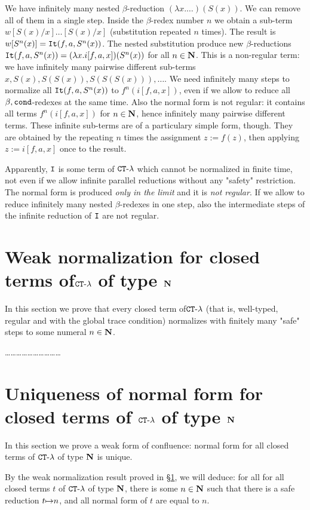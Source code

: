 \documentclass{article}
\begin{document}
We have infinitely many nested $\beta$-reduction $(\lambda x. \ldots)(S(x))$.
We can remove all of them in a single step. Inside the $\beta$-redex number $n$ we obtain a sub-term
$w[S(x)/x]\ldots[S(x)/x]$ (substitution repeated $n$ times).
The result is $w[S^n(x)] = {\tt It}(f,a,S^n(x))$.
The nested substitution produce new $\beta$-reductions 
${\tt It}(f,a,S^n(x)) = (\lambda x.i[f,a,x])(S^n(x))$ for all $n \in {\bf N}$.
This is a non-regular term: we have infinitely many pairwise different 
sub-terms $x,S(x),S(S(x)), S(S(S(x))), \ldots$.
We need infinitely many steps to normalize all ${\tt It}(f,a,S^n(x))$ to $f^n(i[f,a,x])$, 
even if we allow to reduce all $\beta,{\tt cond}$-redexes at the same time.
Also the normal form is not regular: it contains all terms $f^n(i[f,a,x])$ for $n \in {\bf N}$, hence
infinitely many pairwise different terms. These infinite sub-terms are of a particulary simple form, though. 
They are obtained by the repeating $n$ times the assignment $z:=f(z)$, then applying $z:=i[f,a,x]$ once
to the result.

Apparently, ${\tt I}$ 
is some term of ${ {\tt CT} \mbox{-} \lambda}$ which cannot be normalized in finite time, not even if we allow
infinite parallel reductions without any "safety" restriction. The normal form is produced \emph{only in the limit}
and it is \emph{not regular}. If we allow to reduce infinitely many nested $\beta$-redexes in one step, also
the intermediate steps of the infinite reduction of ${\tt I}$ are not regular.


\section{Weak normalization for closed terms of${ {\tt CT} \mbox{-} \lambda}$ of type ${\bf N}$}
\label{section-weak-normalization}
In this section we prove that every closed term of${ {\tt CT} \mbox{-} \lambda}$
 (that is, well-typed, regular and with the global trace condition) normalizes with finitely many "safe" steps
to some numeral $n \in {\bf N}$.

\ldots\ldots\ldots\ldots\ldots\ldots\ldots\ldots\ldots\ldots

\section{Uniqueness of normal form for closed terms of ${ {\tt CT} \mbox{-} \lambda}$ of type ${\bf N}$}
In this section we prove a weak form of confluence: normal form for
all closed terms of ${ {\tt CT} \mbox{-} \lambda}$ of type ${\bf N}$ is unique.

By the weak normalization result proved in \S \ref{section-weak-normalization},
we will deduce: for all for all closed terms $t$ of ${ {\tt CT} \mbox{-} \lambda}$ of type ${\bf N}$, 
there is some $n \in {\bf N}$ such that there is a safe reduction $t {\mapsto} n$, and all normal form of $t$
are equal to $n$.
\end{document}
